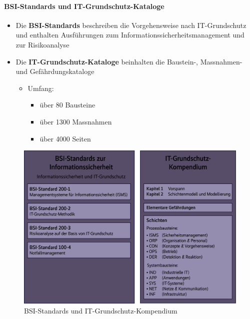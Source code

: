 \documentclass[10pt,a4paper]{article}
\begin{document}
\paragraph*{BSI-Standards und IT-Grundschutz-Kataloge}
\begin{itemize}[noitemsep,topsep=0pt,leftmargin=*]
    \item Die \textbf{BSI-Standards} beschreiben die Vorgehensweise nach IT-Grundschutz und enthalten Ausführungen zum Informationssicherheitsmanagement und zur Risikoanalyse
    \item Die \textbf{IT-Grundschutz-Kataloge} beinhalten die Baustein-, Massnahmen- und Gefährdungskataloge
    \begin{itemize}[noitemsep,topsep=0pt,leftmargin=*]
        \item Umfang:
        \begin{itemize}[noitemsep,topsep=0pt,leftmargin=*]
            \item über 80 Bausteine
            \item über 1300 Massnahmen
            \item über 4000 Seiten
        \end{itemize}
    \end{itemize}
\end{itemize}
\begin{figure}[H]
    \begin{center}
    \includegraphics[width=16cm]{images/BSIgrundschutz.png}
    \caption{BSI-Standards und IT-Grundschutz-Kompendium \cite{heise}}
    \label{bsigrundschutz}
    \end{center}
\end{figure}
\end{document}
